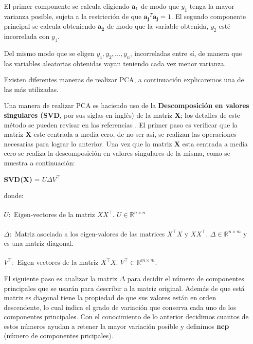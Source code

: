 El primer componente se calcula eligiendo $\mathbf{a_{1}}$ de modo que $y_{1}$ tenga la mayor varianza posible, sujeta a la restricción de que $\mathbf{a_{j}}^{T} \mathbf{a_{j}} = 1$. El segundo componente principal se calcula obteniendo $\mathbf{a_{2}}$ de modo que la variable obtenida, $y_{2}$ esté incorrelada con $y_{1}$.

Del mismo modo que se eligen $y_{1}, y_{2}, ..., y_{n}$, incorreladas entre sí, de manera que las variables aleatorias obtenidas vayan teniendo cada vez menor varianza.

Existen diferentes maneras de realizar PCA, a continuación explicaremos una de las más utilizadas.

Una manera de realizar PCA es haciendo uso de la \textbf{Descomposición en valores singulares (SVD}, por sus siglas en inglés) de la matriz \textbf{X}; los detalles de este método se pueden revisar en las referencias . El primer paso es verificar que la matriz \textbf{X} este centrada a media cero, de no ser así, se realizan las operaciones necesarias para lograr lo anterior. Una vez que la matriz \textbf{X} esta centrada a media cero se realiza la descomposición en valores singulares de la misma, como se muestra a continuación: 

\begin{center}
	\textbf{SVD(X)} = $U \Delta V ^\top$ 
\end{center}

donde: \\ \\

\noindent \textbf{$U:$ } Eigen-vectores de la matriz $XX^\top.$ $U \in \mathbb{R}^{n\times n}$ \\ \\
\textbf{$\Delta:$ }Matriz asociada a los eigen-valores de las matrices $X^\top X$ y $XX^\top$. $\Delta \in \mathbb{R}^{n\times m} $ y es una matriz diagonal.\\ \\
\textbf{$V^\top:$ }Eigen-vectores de la matriz $X^\top X$. $V^\top \in \mathbb{R}^{m\times m}$.

El siguiente paso es analizar la matriz $\Delta$ para decidir el número de componentes principales que se usarán para describir a la matriz original. Además de que está matriz es diagonal tiene la propiedad de que sus valores están en orden descendente, lo cual indica el grado de variación que conserva cada uno de los componentes principales. Con el conocimiento de lo anterior decidimos cuantos de estos números ayudan a retener la mayor variación posible y definimos \textbf{ncp} (número de componentes pricipales).

